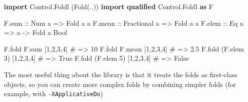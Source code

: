 \documentclass[]{article}
\newenvironment{Shaded}{}{}
\newcommand{\CommentTok}[1]{\textcolor[rgb]{0.38,0.63,0.69}{\textit{#1}}}
\newcommand{\DataTypeTok}[1]{\textcolor[rgb]{0.56,0.13,0.00}{#1}}
\newcommand{\DecValTok}[1]{\textcolor[rgb]{0.25,0.63,0.44}{#1}}
\newcommand{\FunctionTok}[1]{\textcolor[rgb]{0.02,0.16,0.49}{#1}}
\newcommand{\KeywordTok}[1]{\textcolor[rgb]{0.00,0.44,0.13}{\textbf{#1}}}
\newcommand{\NormalTok}[1]{#1}
\newcommand{\OperatorTok}[1]{\textcolor[rgb]{0.40,0.40,0.40}{#1}}
\newcommand{\OtherTok}[1]{\textcolor[rgb]{0.00,0.44,0.13}{#1}}
\newcommand{\PreprocessorTok}[1]{\textcolor[rgb]{0.74,0.48,0.00}{#1}}
\begin{document}
\begin{Shaded}
\begin{Highlighting}[]
\KeywordTok{import}           \DataTypeTok{Control.Foldl}\NormalTok{   (}\DataTypeTok{Fold}\NormalTok{(..))}
\KeywordTok{import} \KeywordTok{qualified} \DataTypeTok{Control.Foldl}   \KeywordTok{as} \DataTypeTok{F}

\NormalTok{F.sum}\OtherTok{  ::} \DataTypeTok{Num}\NormalTok{ a        }\OtherTok{=>} \DataTypeTok{Fold}\NormalTok{ a a}
\NormalTok{F.mean}\OtherTok{ ::} \DataTypeTok{Fractional}\NormalTok{ a }\OtherTok{=>} \DataTypeTok{Fold}\NormalTok{ a a}
\NormalTok{F.elem}\OtherTok{ ::} \DataTypeTok{Eq}\NormalTok{ a         }\OtherTok{=>}\NormalTok{ a }\OtherTok{{-}>} \DataTypeTok{Fold}\NormalTok{ a }\DataTypeTok{Bool}

\NormalTok{F.fold F.sum  [}\DecValTok{1}\NormalTok{,}\DecValTok{2}\NormalTok{,}\DecValTok{3}\NormalTok{,}\DecValTok{4}\NormalTok{]}
\PreprocessorTok{\#   => 10}
\NormalTok{F.fold F.mean [}\DecValTok{1}\NormalTok{,}\DecValTok{2}\NormalTok{,}\DecValTok{3}\NormalTok{,}\DecValTok{4}\NormalTok{]}
\PreprocessorTok{\#   => 2.5}
\NormalTok{F.fold (F.elem }\DecValTok{3}\NormalTok{) [}\DecValTok{1}\NormalTok{,}\DecValTok{2}\NormalTok{,}\DecValTok{3}\NormalTok{,}\DecValTok{4}\NormalTok{]}
\PreprocessorTok{\#   => True}
\NormalTok{F.fold (F.elem }\DecValTok{5}\NormalTok{) [}\DecValTok{1}\NormalTok{,}\DecValTok{2}\NormalTok{,}\DecValTok{3}\NormalTok{,}\DecValTok{4}\NormalTok{]}
\PreprocessorTok{\#   => False}
\end{Highlighting}
\end{Shaded}

The most useful thing about the library is that it treats the folds as
first-class objects, so you can create more complex folds by combining simpler
folds (for example, with \texttt{-XApplicativeDo})

\begin{Shaded}
\end{Shaded}
\end{document}
